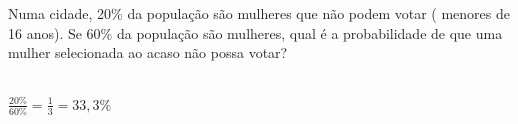 \begin{ex}
Numa cidade, 20\% da população são mulheres que não podem votar ( menores de 16 anos). Se 60\% da população são mulheres, qual é a probabilidade de que uma mulher selecionada ao acaso não possa votar?
  \begin{sol}
    \phantom{A} \\
    $\frac{20\%}{60\%}=\frac{1}{3}=33,3\%$
  \end{sol}
\end{ex}